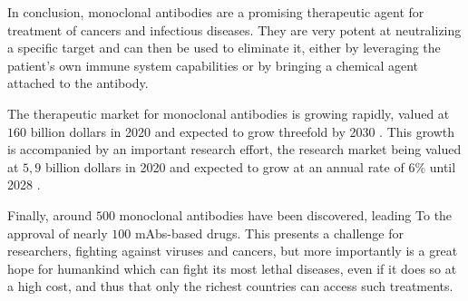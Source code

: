 In conclusion, monoclonal antibodies are a promising therapeutic agent for
treatment of cancers and infectious diseases. They are very potent at neutralizing
a specific target and can then be used to eliminate it, either by leveraging the patient's
own immune system capabilities or by bringing a chemical agent attached to the antibody.

The therapeutic market for monoclonal antibodies is growing rapidly, valued
at $160$ billion dollars in 2020 and expected to grow threefold by 2030
\cite{terdale_monoclonal_2021} \cite{insights_monoclonal_2021}.
This growth is accompanied by an important research effort, the research market
being valued at $5,9$ billion dollars in 2020 and expected to grow
at an annual rate of $6 \%$ until 2028 \cite{markets_global_2021}.

Finally, around $500$ monoclonal antibodies have been discovered, leading To
the approval of nearly $100$ mAbs-based drugs. This presents a challenge for
researchers, fighting against viruses and cancers, but more importantly is a great
hope for humankind which can fight its most lethal diseases, even if it does so
at a high cost, and thus that only the richest countries can access such treatments.